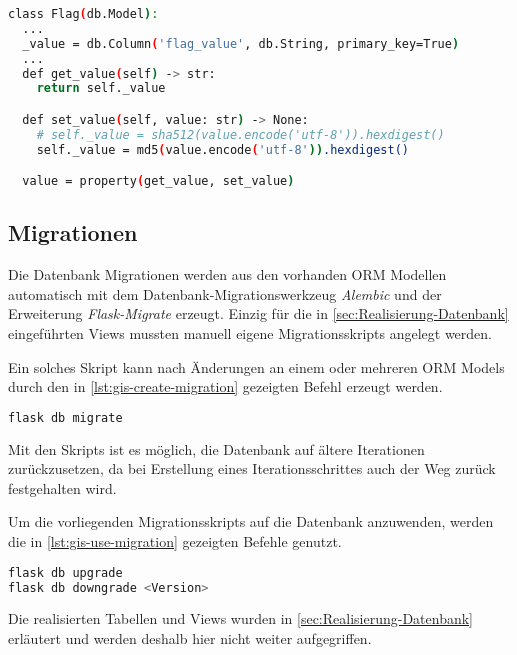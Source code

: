 \begin{lstlisting}[language=bash, frame=single, caption={GIS Nutzerpasswort}, captionpos=b, label={lst:gis-password-hashing}]
class Flag(db.Model):
  ...
  _value = db.Column('flag_value', db.String, primary_key=True)
  ...
  def get_value(self) -> str:
    return self._value

  def set_value(self, value: str) -> None:
    # self._value = sha512(value.encode('utf-8')).hexdigest()
    self._value = md5(value.encode('utf-8')).hexdigest()

  value = property(get_value, set_value)
\end{lstlisting}

\subsection{Migrationen}\label{sub:realisierung-migration}

Die Datenbank Migrationen werden aus den vorhanden ORM Modellen automatisch mit dem Datenbank-Migrationswerkzeug \textit{Alembic} und der Erweiterung \textit{Flask-Migrate} erzeugt. Einzig für die in \autoref{sec:Realisierung-Datenbank} eingeführten Views mussten manuell eigene Migrationsskripts angelegt werden.

Ein solches Skript kann nach Änderungen an einem oder mehreren ORM Models durch den in \ref{lst:gis-create-migration} gezeigten Befehl erzeugt werden.

\begin{lstlisting}[language=bash, frame=single, caption={GIS Erzeugung eines Migrationsskripts}, captionpos=b, label={lst:gis-create-migration}]
flask db migrate
\end{lstlisting}

Mit den Skripts ist es möglich, die Datenbank auf ältere Iterationen zurückzusetzen, da bei Erstellung eines Iterationsschrittes auch der Weg zurück festgehalten wird.

Um die vorliegenden Migrationsskripts auf die Datenbank anzuwenden, werden die in \autoref{lst:gis-use-migration} gezeigten Befehle genutzt.

\begin{lstlisting}[language=bash, frame=single, caption={GIS Nutzung eines Migrationsskripts}, captionpos=b, label={lst:gis-use-migration}]
flask db upgrade
flask db downgrade <Version>
\end{lstlisting}

Die realisierten Tabellen und Views wurden in \autoref{sec:Realisierung-Datenbank} erläutert und werden deshalb hier nicht weiter aufgegriffen.

